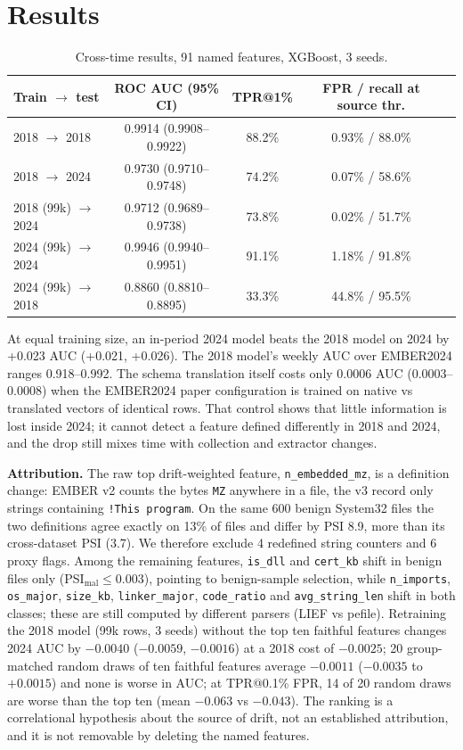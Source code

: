 \documentclass[10pt]{article}
\begin{document}
\section{Results}
\begin{table}[h]\centering\small
\begin{tabular}{lcccc}\toprule
Train $\rightarrow$ test & ROC AUC (95\% CI) & TPR@1\% & FPR / recall at source thr.\\\midrule
2018 $\rightarrow$ 2018 & 0.9914 (0.9908--0.9922) & 88.2\% & 0.93\% / 88.0\%\\
2018 $\rightarrow$ 2024 & 0.9730 (0.9710--0.9748) & 74.2\% & 0.07\% / 58.6\%\\
2018 (99k) $\rightarrow$ 2024 & 0.9712 (0.9689--0.9738) & 73.8\% & 0.02\% / 51.7\%\\
2024 (99k) $\rightarrow$ 2024 & 0.9946 (0.9940--0.9951) & 91.1\% & 1.18\% / 91.8\%\\
2024 (99k) $\rightarrow$ 2018 & 0.8860 (0.8810--0.8895) & 33.3\% & 44.8\% / 95.5\%\\\bottomrule
\end{tabular}
\caption{Cross-time results, 91 named features, XGBoost, 3 seeds.}\end{table}

At equal training size, an in-period 2024 model beats the 2018 model on 2024 by +0.023 AUC
(+0.021, +0.026). The 2018 model's weekly AUC over EMBER2024 ranges 0.918--0.992. The schema
translation itself costs only 0.0006 AUC (0.0003--0.0008) when the EMBER2024 paper configuration is
trained on native vs translated vectors of identical rows. That control shows that little information
is lost inside 2024; it cannot detect a feature defined differently in 2018 and 2024, and the drop
still mixes time with collection and extractor changes.

\textbf{Attribution.} The raw top drift-weighted feature, \texttt{n\_embedded\_mz}, is a definition
change: EMBER v2 counts the bytes \texttt{MZ} anywhere in a file, the v3 record only strings containing
\texttt{!This program}. On the same 600 benign System32 files the two definitions agree exactly on 13\%
of files and differ by PSI 8.9, more than its cross-dataset PSI (3.7). We therefore exclude 4 redefined
string counters and 6 proxy flags. Among the remaining features, \texttt{is\_dll} and \texttt{cert\_kb}
shift in benign files only (PSI$_\text{mal}\le0.003$), pointing to benign-sample selection, while
\texttt{n\_imports}, \texttt{os\_major}, \texttt{size\_kb}, \texttt{linker\_major}, \texttt{code\_ratio} and
\texttt{avg\_string\_len} shift in both classes; these are still computed by different parsers (LIEF vs
pefile). Retraining the 2018 model (99k rows, 3 seeds) without the top ten faithful features changes
2024 AUC by $-0.0040$ ($-0.0059$, $-0.0016$) at a 2018 cost of $-0.0025$; 20 group-matched random
draws of ten faithful features average $-0.0011$ ($-0.0035$ to $+0.0015$) and none is worse in AUC; at TPR@0.1\% FPR, 14 of 20 random draws are worse than the top ten
(mean $-0.063$ vs $-0.043$). The ranking is a correlational hypothesis about the source of drift, not an
established attribution, and it is not removable by deleting the named features.
\end{document}
